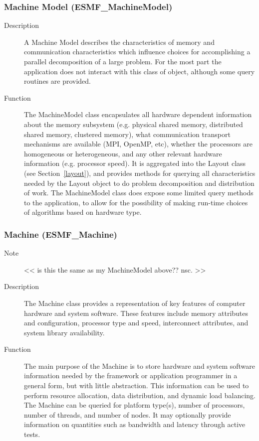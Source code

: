 \subsubsection{Machine Model (ESMF\_MachineModel)}
\label{sec:machinemodel} 
\begin{description}
\item [Description] A Machine Model describes the characteristics of memory and
communication characteristics which influence choices for accomplishing a parallel 
decomposition of a large problem.  For the most part the application does not
interact with this class of object, although some query routines are provided.
\item [Function] The MachineModel class encapsulates all hardware dependent information
about the memory subsystem (e.g. physical shared memory, distributed shared memory, clustered
memory), what communication transport mechanisms are available (MPI, OpenMP, etc), 
whether the processors are homogeneous or heterogeneous, and 
any other relevant hardware information (e.g. processor speed).
It is aggregated into the Layout class (see Section~\ref{layout}), and provides
methods for querying all characteristics needed by the Layout object to do 
problem decomposition and distribution of work.
The MachineModel class does expose some limited query methods to the application, 
to allow for the possibility of making run-time choices of algorithms based on hardware type.
\end{description}

\subsubsection{Machine (ESMF\_Machine)} 
\begin{description}
\item [Note] << is this the same as my MachineModel above??  nsc. >>
\item [Description] The Machine class provides a representation of 
key features of computer hardware and system software.  These
features include memory attributes and configuration, processor type and speed,
interconnect attributes, and system library availability.
\item [Function]
The main purpose of the Machine is to store hardware and system software
information needed by the framework or application programmer in a general
form, but with little abstraction.  This information can be used to perform resource 
allocation, data distribution, and dynamic load balancing.  The Machine can be queried
for platform type(s), number of processors, number of threads, and number of 
nodes.  It may optionally provide information on quantities such as bandwidth and 
latency through active tests.  
\end{description}

